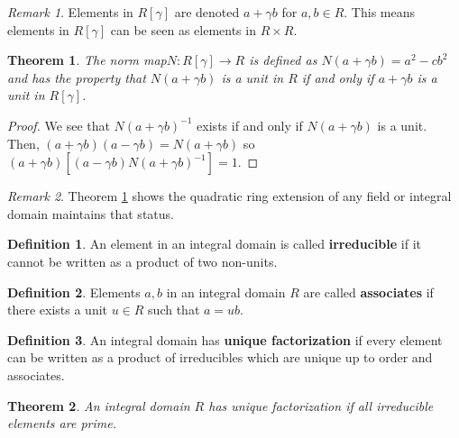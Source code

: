 \documentclass[parskip=half]{scrartcl}  %
\theoremstyle{definition}
\newtheorem{definition}{Definition}[section]
\theoremstyle{plain}
\newtheorem{theorem}{Theorem}[definition]
\theoremstyle{remark}
\newtheorem{remark}{Remark}[definition]
\begin{document}
\begin{remark}
    Elements in $R[\gamma]$ are denoted $a+\gamma b$ for $a,b\in R$.
    This means elements in $R[\gamma]$ can be seen as elements in $R\times R$.
\end{remark}

\begin{theorem}
    \label{thm:norm map}
    The norm map\footnotemark $N:R[\gamma]\to R$ is defined as
    $N(a+\gamma b)=a^2-cb^2$ and has the property that $N(a+\gamma b)$ is a
    unit in $R$ if and only if $a+\gamma b$ is a unit in $R[\gamma]$.
\end{theorem}

\begin{proof}
    We see that $N(a+\gamma b)^{-1}$ exists if and only if $N(a+\gamma b)$ is a unit.
    Then, $(a+\gamma b)(a-\gamma b)=N(a+\gamma b)$ so
    $(a+\gamma b)\left[(a-\gamma b)N(a+\gamma b)^{-1}\right]=1$.
\end{proof}

\begin{remark}
    Theorem \ref{thm:norm map} shows the quadratic ring extension of any field
    or integral domain maintains that status.
\end{remark}

\begin{definition}
    An element in an integral domain is called \textbf{irreducible} if it
    cannot be written as a product of two non-units.
\end{definition}

\begin{definition}
    Elements $a,b$ in an integral domain $R$ are called \textbf{associates} if
    there exists a unit $u\in R$ such that $a=ub$.
\end{definition}

\begin{definition}
    \label{def:unique factorization}
    An integral domain has \textbf{unique factorization} if every element can
    be written as a product of irreducibles which are unique up to order and
    associates.
\end{definition}

\begin{theorem}
    \label{thm:unique factorization}
    An integral domain $R$ has unique factorization if all irreducible elements
    are prime.
\end{theorem}
\end{document}
